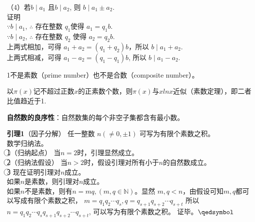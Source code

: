 （4）若$b\mid a_1$ 且$b\mid a_2$, 则 $b\mid a_1\pm a_2$.\\
证明\\
$\because b\mid a_1$, $\therefore$ 存在整数 $q_1$使得 $a_1 = q_1b$.\\
$\because b\mid a_2$, $\therefore$ 存在整数 $q_2$ 使得 $a_2 = q_2b$.\\
上两式相加，可得 $a_1+a_2=(q_1+q_2)b$，所以 $b\mid a_1+a_2$.\\
上两式相减，可得 $a_1-a_2=(q_1-q_1)b$, 所以 $b\mid a_1-a_2$.

1不是素数（prime number）也不是合数（composite number）。

以$\pi(x)$记不超过正数$x$的正素数个数，则$\pi(x)$与$xln x$近似（素数定理），即二者比值趋近于1.

\textbf{自然数的良序性}：自然数集的每个非空子集都含有最小数。

\textbf{引理1}（因子分解） 任一整数 $n(\neq 0, \pm 1)$ 可写为有限个素数之积。\\
数学归纳法。\\
\textcircled{1}（归纳起点） 当$n=2$时，引理显然成立。\\
\textcircled{2}（归纳法假设） 当$n>2$时，假设引理对所有小于$n$的自然数成立。\\
\textcircled{3} 现在证明引理对$n$成立。\\
如果$n$是素数，则引理对$n$成立。\\
如果$n$不是素数，则有$n=mq, (m,q\in \mathbb{N})$。显然 $m,q<n$，由假设可知$m,q$都可以写成有限个素数之积，
$m=q_1q_2\cdots q_s, q=q_{s+1}q_{s+2}\cdots q_{s+t}$
所以$n=q_1q_2\cdots q_s q_{s+1}q_{s+2}\cdots q_{s+t}$, 可以写为有限个素数之积。
证毕。$\hfill\qedsymbol$


